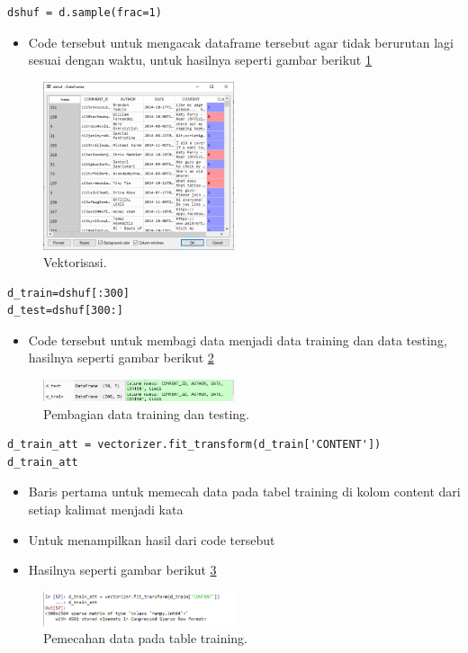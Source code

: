 \begin{enumerate}
\begin{verbatim}
dshuf = d.sample(frac=1)
\end{verbatim}
\begin{itemize}
\item Code tersebut untuk mengacak dataframe tersebut agar tidak berurutan lagi sesuai dengan waktu, untuk hasilnya seperti gambar berikut \ref{yt5}
\end{itemize}
		\begin{figure}[ht]
		\centerline{\includegraphics[width=0.5\textwidth]{figures/im/yt5.png}}
		\caption{Vektorisasi.}
		\label{yt5}
		\end{figure}

\begin{verbatim}
d_train=dshuf[:300]
d_test=dshuf[300:]
\end{verbatim}
\begin{itemize}
\item Code tersebut untuk membagi data menjadi data training dan data testing, hasilnya seperti gambar berikut \ref{yt6}
\end{itemize}
		\begin{figure}[ht]
		\centerline{\includegraphics[width=0.5\textwidth]{figures/im/yt6.png}}
		\caption{Pembagian data training dan testing.}
		\label{yt6}
		\end{figure}

\begin{verbatim}
d_train_att = vectorizer.fit_transform(d_train['CONTENT'])
d_train_att
\end{verbatim}
\begin{itemize}
\item Baris pertama untuk memecah data pada tabel training di kolom content dari setiap kalimat menjadi kata
\item Untuk menampilkan hasil dari code tersebut
\item Hasilnya seperti gambar berikut \ref{yt7}
\end{itemize}
		\begin{figure}[ht]
		\centerline{\includegraphics[width=0.5\textwidth]{figures/im/yt7.png}}
		\caption{Pemecahan data pada table training.}
		\label{yt7}
		\end{figure}


\end{enumerate}
